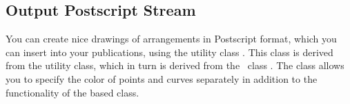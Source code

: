 \subsection{Output Postscript Stream}\label{arr_ssec:ps_stream}
You can create nice drawings of arrangements in Postscript format, which
you can insert into your publications, using the utility class 
. This class is derived from the 
 utility class, which in turn is derived from
the \leda\ class . The 
class allows you to specify the color of points and curves separately
in addition to the functionality of the based class.
